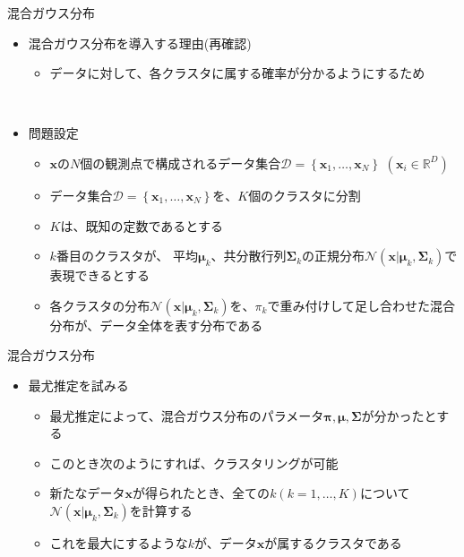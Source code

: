 \documentclass[dvipdfmx,notheorems,t]{beamer}
\begin{document}
\begin{frame}{混合ガウス分布}

\begin{itemize}
	\item 混合ガウス分布を導入する理由(再確認)
	\begin{itemize}
		\item データに対して、\alert{各クラスタに属する確率}が分かるようにするため
	\end{itemize} \
	
	\item 問題設定
	\begin{itemize}
		\item $\bm{x}$の$N$個の観測点で構成されるデータ集合$\mathcal{D} = \left\{ \bm{x}_1, \ldots, \bm{x}_N \right\}$ $(\bm{x}_i \in \mathbb{R}^D)$
		\item データ集合$\mathcal{D} = \left\{ \bm{x}_1, \ldots, \bm{x}_N \right\}$を、$K$個のクラスタに分割
		\item $K$は、\alert{既知の定数}であるとする
		\newline
		\item $k$番目のクラスタが、\color{red} 平均$\bm{\mu}_k$、共分散行列$\bm{\Sigma}_k$の正規分布$\mathcal{N}(\bm{x} | \bm{\mu}_k, \bm{\Sigma}_k)$で表現できる\normalcolor とする
		\newline
		\item 各クラスタの分布$\mathcal{N}(\bm{x} | \bm{\mu}_k, \bm{\Sigma}_k)$を、$\pi_k$で重み付けして足し合わせた混合分布が、データ全体を表す分布である
	\end{itemize}
\end{itemize}

\end{frame}

\begin{frame}{混合ガウス分布}

\begin{itemize}
	\item 最尤推定を試みる
	\begin{itemize}
		\item 最尤推定によって、混合ガウス分布のパラメータ$\bm{\pi}, \bm{\mu}, \bm{\Sigma}$が分かったとする
		\item このとき次のようにすれば、クラスタリングが可能
		\newline
		\item 新たなデータ$\bm{x}$が得られたとき、全ての$k (k = 1, \ldots, K)$について$\mathcal{N}(\bm{x} | \bm{\mu}_k, \bm{\Sigma}_k)$を計算する
		\item これを最大にするような$k$が、データ$\bm{x}$が属するクラスタである
	\end{itemize}
\end{itemize}

\end{frame}
\end{document}
